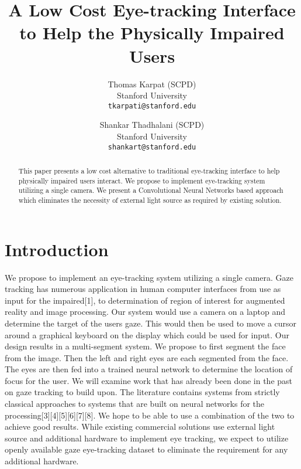 \documentclass[10pt,twocolumn,letterpaper]{article}
\begin{document}
\title{A Low Cost Eye-tracking Interface to Help the Physically
  Impaired Users}

\author{Thomas Karpat (SCPD)\\
Stanford University \\
{\tt\small tkarpati@stanford.edu}
\and
Shankar Thadhalani (SCPD)\\
Stanford University \\
{\tt\small shankart@stanford.edu}
}

\maketitle

\begin{abstract}
This paper presents a low cost alternative to traditional eye-tracking
interface to help physically impaired users interact. We propose to
implement eye-tracking system utilizing a single camera. We present a
Convolutional Neural Networks based approach which eliminates the
necessity of external light source as required by existing solution.
\end{abstract}

\section{Introduction}
We propose to implement an eye-tracking
system utilizing a single camera. Gaze tracking has numerous
application in human computer interfaces from use as input for the
impaired[1], to determination of region of interest for augmented
reality and image processing. Our system would use a camera on a
laptop and determine the target of the users gaze. This would then be
used to move a cursor around a graphical keyboard on the display which
could be used for input. Our design results in a multi-segment
system. We propose to first segment the face from the image. Then the
left and right eyes are each segmented from the face. The eyes are
then fed into a trained neural network to determine the location of
focus for the user. We will examine work that has already been done in
the past on gaze tracking to build upon. The literature contains
systems from strictly classical approaches to systems that are built
on neural networks for the processing[3][4][5][6][7][8]. We hope to be
able to use a combination of the two to achieve good results. While
existing commercial solutions use external light source and additional
hardware to implement eye tracking, we expect to utilize openly
available gaze eye-tracking dataset to eliminate the requirement for
any additional hardware.
\end{document}
